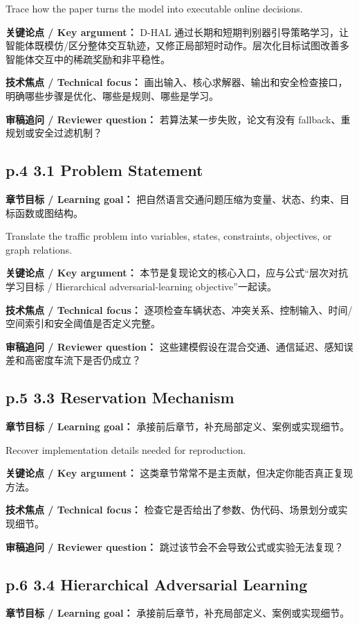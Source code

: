 \documentclass[UTF8,a4paper,11pt,fontset=fandol]{ctexart}
\begin{document}
Trace how the paper turns the model into executable online decisions.

\textbf{关键论点 / Key argument：} D-HAL 通过长期和短期判别器引导策略学习，让智能体既模仿/区分整体交互轨迹，又修正局部短时动作。层次化目标试图改善多智能体交互中的稀疏奖励和非平稳性。

\textbf{技术焦点 / Technical focus：} 画出输入、核心求解器、输出和安全检查接口，明确哪些步骤是优化、哪些是规则、哪些是学习。

\textbf{审稿追问 / Reviewer question：} 若算法某一步失败，论文有没有 fallback、重规划或安全过滤机制？

\subsection*{p.4 3.1 Problem Statement}
\textbf{章节目标 / Learning goal：} 把自然语言交通问题压缩为变量、状态、约束、目标函数或图结构。

Translate the traffic problem into variables, states, constraints, objectives, or graph relations.

\textbf{关键论点 / Key argument：} 本节是复现论文的核心入口，应与公式“层次对抗学习目标 / Hierarchical adversarial-learning objective”一起读。

\textbf{技术焦点 / Technical focus：} 逐项检查车辆状态、冲突关系、控制输入、时间/空间索引和安全阈值是否定义完整。

\textbf{审稿追问 / Reviewer question：} 这些建模假设在混合交通、通信延迟、感知误差和高密度车流下是否仍成立？

\subsection*{p.5 3.3 Reservation Mechanism}
\textbf{章节目标 / Learning goal：} 承接前后章节，补充局部定义、案例或实现细节。

Recover implementation details needed for reproduction.

\textbf{关键论点 / Key argument：} 这类章节常常不是主贡献，但决定你能否真正复现方法。

\textbf{技术焦点 / Technical focus：} 检查它是否给出了参数、伪代码、场景划分或实现细节。

\textbf{审稿追问 / Reviewer question：} 跳过该节会不会导致公式或实验无法复现？

\subsection*{p.6 3.4 Hierarchical Adversarial Learning}
\textbf{章节目标 / Learning goal：} 承接前后章节，补充局部定义、案例或实现细节。
\end{document}
